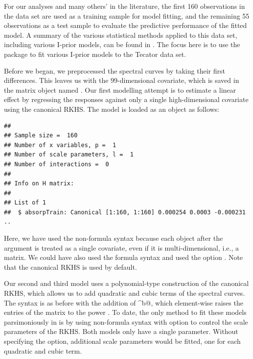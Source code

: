 For our analyses and many others' in the literature, the first 160 observations in the data set are used as a training sample for model fitting, and the remaining 55 observations as a test sample to evaluate the predictive performance of the fitted model. A summary of the various statistical methods applied to this data set, including various I-prior models, can be found in \cite{bergsma2016}. The focus here is to use the  package to fit various I-prior models to the Tecator data set.

Before we began, we preprocessed the spectral curves by taking their first differences. This leaves us with the 99-dimensional covariate, which is saved in the matrix object named . Our first modelling attempt is to estimate a linear effect by regressing the responses  against only a single high-dimensional covariate  using the canonical RKHS. The model is loaded as an  object as follows:

\begin{knitrout}
\color{fgcolor}\begin{kframe}
\begin{alltt}
 \hlkwb{<-} \hlstd{(} 
\end{alltt}
\end{kframe}
\end{knitrout}
\begin{knitrout}
\color{fgcolor}\begin{kframe}
\begin{verbatim}
## 
## Sample size =  160 
## Number of x variables, p =  1 
## Number of scale parameters, l =  1 
## Number of interactions =  0 
## 
## Info on H matrix:
## 
## List of 1
##  $ absorpTrain: Canonical [1:160, 1:160] 0.000254 0.0003 -0.000231 ..
\end{verbatim}
\end{kframe}
\end{knitrout}

Here, we have used the non-formula syntax because each object after the  argument is treated as a single covariate, even if it is multi-dimensional, i.e., a matrix. We could have also used the formula syntax and used the  option . Note that the canonical RKHS is used by default.

Our second and third model uses a polynomial-type construction of the canonical RKHS, which allows us to add quadratic and cubic terms of the spectral curves. The syntax is as before with the addition of \verb@absorpTrain^b@, which element-wise raises the entries of the matrix   to the power . To date, the only method to fit these models parsimoniously in  is by using non-formula syntax with  option  to control the scale parameters of the RKHS. Both models only have a single parameter. Without specifying the  option, additional scale parameters would be fitted, one for each quadratic and cubic term.

